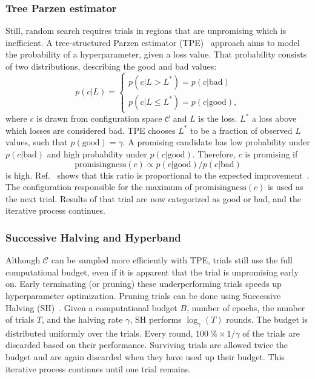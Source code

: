 \subsubsection{Tree Parzen estimator}
Still, random search requires trials in regions that are unpromising which is inefficient.
A tree-structured Parzen estimator (TPE)~ approach aims to model the probability of a hyperparameter, given a loss value.
That probability consists of two distributions, describing the good and bad values:
\begin{equation}
    p(c|L) =
    \begin{cases}
        p(c|L > L^*) = p(c|\mathrm{bad}) \\
        p(c|L \leq L^*) = p(c|\mathrm{good}),
    \end{cases}
\end{equation}
where $c$ is drawn from configuration space $\mathcal{C}$ and $L$ is the loss.
$L^*$ a loss above which losses are considered bad.
TPE chooses $L^*$ to be a fraction of observed $L$ values, such that $p(\mathrm{good}) = \gamma$.
A promising candidate has low probability under $p(c|\mathrm{bad})$ and high probability under $p(c|\mathrm{good})$.
Therefore, $c$ is promising if
\begin{equation}
    \mathrm{promisingness}(c) \propto p(c|\mathrm{good}) / p(c|\mathrm{bad})
\end{equation}
is high.
Ref.~ shows that this ratio is proportional to the expected improvement~.
The configuration responsible for the maximum of $\mathrm{promisingness}(c)$ is used as the next trial.
Results of that trial are now categorized as good or bad, and the iterative process continues.

\subsubsection{Successive Halving and Hyperband}
Although $\mathcal{C}$ can be sampled more efficiently with TPE, trials still use the full computational budget, even if it is apparent that the trial is unpromising early on.
Early terminating (or pruning) these underperforming trials speeds up hyperparameter optimization.
Pruning trials can be done using Successive Halving (SH)~.
Given a computational budget $B$, \eg number of epochs, the number of trials $T$, and the halving rate $\gamma$, SH performs $\log_\gamma(T)$ rounds.
The budget is distributed uniformly over the trials.
Every round, $\qty{100}{\percent} \times 1/\gamma$ of the trials are discarded based on their performance.
Surviving trials are allowed twice the budget and are again discarded when they have used up their budget.
This iterative process continues until one trial remains.

